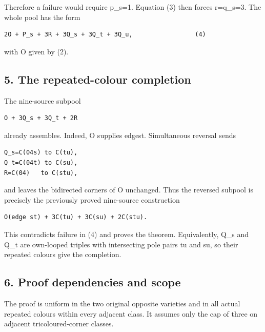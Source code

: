 \documentclass[
  10pt,
]{article}
\begin{document}
Therefore a failure would require p\_s=1. Equation (3) then forces
r=q\_s=3. The whole pool has the form

\begin{verbatim}
2O + P_s + 3R + 3Q_s + 3Q_t + 3Q_u,                 (4)
\end{verbatim}

with O given by (2).

\hypertarget{the-repeated-colour-completion}{%
\subsection*{5. The repeated-colour
completion}\label{the-repeated-colour-completion}}

The nine-source subpool

\begin{verbatim}
O + 3Q_s + 3Q_t + 2R
\end{verbatim}

already assembles. Indeed, O supplies edgest. Simultaneous reversal
sends

\begin{verbatim}
Q_s=C(04s) to C(tu),
Q_t=C(04t) to C(su),
R=C(04)   to C(stu),
\end{verbatim}

and leaves the bidirected corners of O unchanged. Thus the reversed
subpool is precisely the previously proved nine-source construction

\begin{verbatim}
O(edge st) + 3C(tu) + 3C(su) + 2C(stu).
\end{verbatim}

This contradicts failure in (4) and proves the theorem. Equivalently,
Q\_s and Q\_t are own-looped triples with intersecting pole pairs tu and
su, so their repeated colours give the completion.

\hypertarget{proof-dependencies-and-scope}{%
\subsection*{6. Proof dependencies and
scope}\label{proof-dependencies-and-scope}}

The proof is uniform in the two original opposite varieties and in all
actual repeated colours within every adjacent class. It assumes only the
cap of three on adjacent tricoloured-corner classes.
\end{document}
